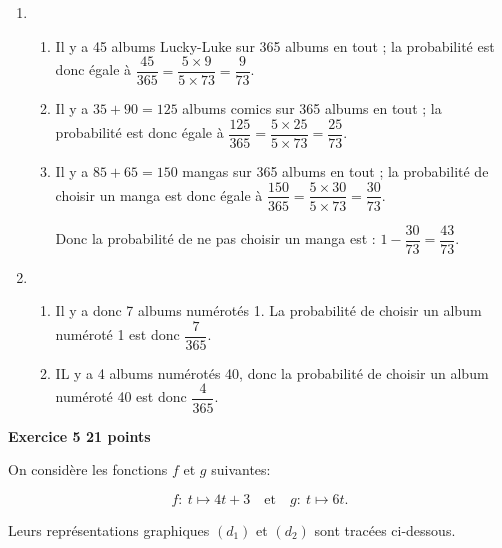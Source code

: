 \documentclass[10pt]{article}
\begin{document}
\begin{enumerate}
\item 
	\begin{enumerate}
		\item %
Il y a 45 albums \og Lucky-Luke\fg{} sur 365 albums en tout ; la probabilité est donc égale à $\dfrac{45}{365} = \dfrac{5 \times 9}{5 \times 73} = \dfrac{9}{73}$.
		\item %
Il y a $35 + 90 = 125$ albums comics sur 365 albums en tout ; la probabilité est donc égale à $\dfrac{125}{365} = \dfrac{5 \times 25}{5 \times 73} = \dfrac{25}{73}$.
		\item %
Il y a $85 + 65 = 150$ mangas sur 365 albums en tout ; la probabilité de choisir un manga est donc égale à $\dfrac{150}{365} = \dfrac{5 \times 30}{5 \times 73} = \dfrac{30}{73}$.

Donc la probabilité de ne pas choisir un manga est : $1 - \dfrac{30}{73} = \dfrac{43}{73}$.
	\end{enumerate}
\item %
	\begin{enumerate}
		\item %
Il y a donc 7 albums numérotés 1. La probabilité de choisir un album numéroté 1 est donc $\dfrac{7}{365}$.
		\item %
IL y a 4 albums numérotés 40, donc la probabilité de choisir un album numéroté 40 est donc $\dfrac{4}{365}$.
	\end{enumerate}
\end{enumerate}
\vspace{0.5cm}

\textbf{Exercice 5 \hfill 21 points}

\medskip

On considère les fonctions $f$ et $g$ suivantes: 

\[f :\: t \longmapsto  4t + 3\quad \text{et}\quad  g :\: t \longmapsto 6t.\]

Leurs représentations graphiques $\left(d_1\right)$ et $\left(d_2\right)$ sont tracées ci-dessous.
\end{document}

